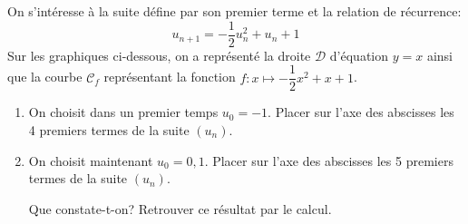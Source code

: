 \documentclass[a4paper]{article}
\begin{document}
\pagebreak
\begin{exerciceinterro}{}{}
    On s'intéresse à la suite défine par son premier terme et la relation de récurrence:
    $$u_{n+1}=-\dfrac{1}{2}u_n^2+u_n+1$$
    Sur les graphiques ci-dessous, on a représenté la droite $\mathcal{D}$ d'équation $y=x$ ainsi que la courbe $\mathcal{C}_f$ représentant la fonction $f:x\longmapsto -\dfrac{1}{2}x^2+x+1$.
	
    \begin{enumerate}
        \item On choisit dans un premier temps $u_0=-1$. Placer sur l'axe des abscisses les 4 premiers termes de la suite $(u_n)$.
        \begin{center}
        \end{center}
        \item On choisit maintenant $u_0=0,1$. Placer sur l'axe des abscisses les 5 premiers termes de la suite $(u_n)$.
           \begin{center}
        \end{center}

        Que constate-t-on? Retrouver ce résultat par le calcul.

    \end{enumerate}

	
\end{exerciceinterro}
\end{document}
